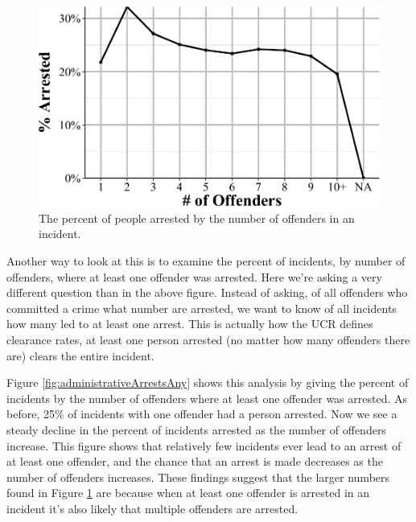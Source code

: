 \documentclass[
  12pt,
  openany]{book}
\begin{document}
\begin{figure}

{\centering \includegraphics[width=0.9\linewidth]{12_nibrs_administrative_files/figure-latex/administrativePercentArrested-1} 

}

\caption{The percent of people arrested by the number of offenders in an incident.}\label{fig:administrativePercentArrested}
\end{figure}

Another way to look at this is to examine the percent of incidents, by number of offenders, where at least one offender was arrested. Here we're asking a very different question than in the above figure. Instead of asking, of all offenders who committed a crime what number are arrested, we want to know of all incidents how many led to at least one arrest. This is actually how the UCR defines clearance rates, at least one person arrested (no matter how many offenders there are) clears the entire incident.

Figure \ref{fig:administrativeArrestsAny} shows this analysis by giving the percent of incidents by the number of offenders where at least one offender was arrested. As before, 25\% of incidents with one offender had a person arrested. Now we see a steady decline in the percent of incidents arrested as the number of offenders increase. This figure shows that relatively few incidents ever lead to an arrest of at least one offender, and the chance that an arrest is made decreases as the number of offenders increases. These findings suggest that the larger numbers found in Figure \ref{fig:administrativePercentArrested} are because when at least one offender is arrested in an incident it's also likely that multiple offenders are arrested.
\end{document}

